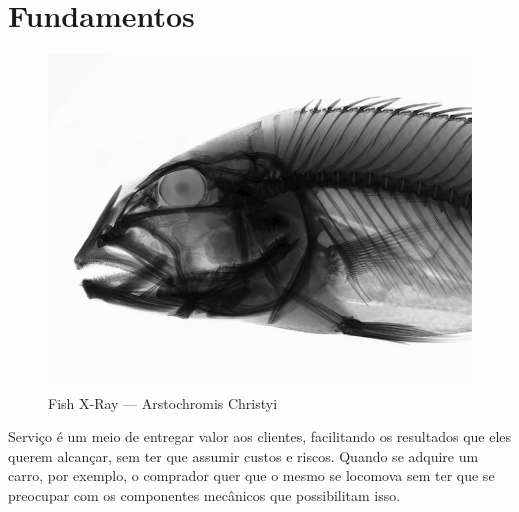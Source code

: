 %
%
%
%


\chapter{Fundamentos}
\label{cha:fund}


\begin{figure}
    \centering
    \includegraphics[width=1\textwidth]{img/fish_xray}\\
    {\scriptsize Fish X-Ray --- Arstochromis Christyi}
\end{figure}

Serviço é um meio de entregar valor aos clientes, facilitando os resultados que
eles querem alcançar, sem ter que assumir custos e riscos. Quando se adquire um
carro, por exemplo, o comprador quer que o mesmo se locomova sem ter que se
preocupar com os componentes mecânicos que possibilitam isso.

